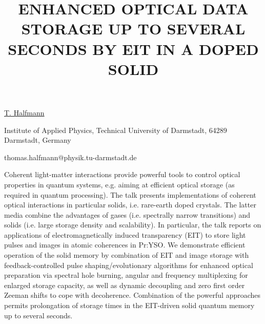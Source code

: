 \title{ENHANCED OPTICAL DATA STORAGE UP TO SEVERAL SECONDS BY EIT IN A DOPED SOLID}

\underline{T. Halfmann} 

{\normalsize{\vspace{-4mm}
Institute of Applied Physics, Technical University of Darmstadt,
64289 Darmstadt, Germany

\email thomas.halfmann@physik.tu-darmstadt.de}}

Coherent light-matter interactions provide powerful tools to control optical properties in quantum systems, e.g. aiming at efficient optical storage (as required in quantum processing). The talk presents implementations of coherent optical interactions in particular solids, i.e. rare-earth doped crystals. The latter media combine the advantages of gases (i.e. spectrally narrow transitions) and solids (i.e. large storage density and scalability). In particular, the talk reports on applications of electromagnetically induced transparency (EIT) to store light pulses and images in atomic coherences in Pr:YSO. We demonstrate efficient operation of the solid memory by combination of EIT and image storage with feedback-controlled pulse shaping/evolutionary algorithms for enhanced optical preparation via spectral hole burning, angular and frequency multiplexing for enlarged storage capacity, as well as dynamic decoupling and zero first order Zeeman shifts to cope with decoherence. Combination of the powerful approaches permits prolongation of storage times in the EIT-driven solid quantum memory up to several seconds.

\vspace{\baselineskip} 